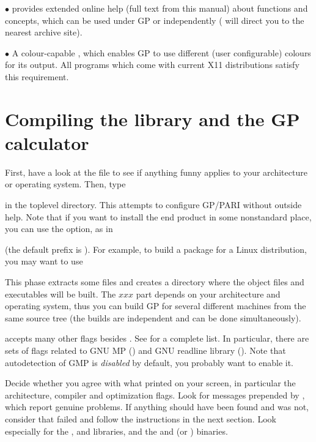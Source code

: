   $\bullet$  provides extended online help (full text from this
manual) about functions and concepts, which can be used under GP or
independently ( will direct you to the nearest
 archive site).

  $\bullet$ A colour-capable , which enables GP to use different
(user configurable) colours for its output. All  programs which
come with current X11 distributions satisfy this requirement.
\section{Compiling the library and the GP calculator}

 First, have a look at the  file
to see if anything funny applies to your architecture or operating system.
Then, type 


\noindent in the toplevel directory. This attempts to configure GP/PARI
without outside help. Note that if you want to install the end product in
some nonstandard place, you can use the  option, as in


\noindent (the default prefix is ). For example, to build a
package for a Linux distribution, you may want to use


This phase extracts some files and creates a directory  where the
object files and executables will be built. The $xxx$ part depends on your
architecture and operating system, thus you can build GP for several
different machines from the same source tree (the builds are
independent and can be done simultaneously).

  accepts many other flags
besides . See  for a complete list. In
particular, there are sets of flags related to GNU MP () and
GNU readline library (). Note that autodetection of GMP
is \emph{disabled} by default, you probably want to enable it.

Decide whether you agree with what  printed on your screen, in
particular the architecture, compiler and optimization flags. Look for
messages prepended by \kbd{\#\#\#}, which report genuine problems. If
anything should have been found and was not, consider that 
failed and follow the instructions in the next section. Look especially for
the ,  and  libraries, and the  and
 (or ) binaries.

